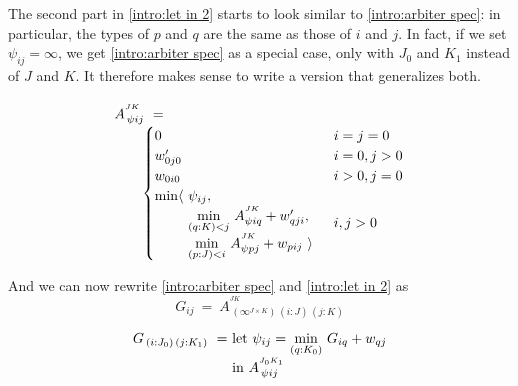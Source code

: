 \medskip
The second part in \eqref{intro:let in 2} starts to look similar to \eqref{intro:arbiter spec}:
in particular, the types of $p$ and $q$ are the same as those of $i$ and $j$.
In fact, if we set $\psi_{ij}=\infty$, we get \eqref{intro:arbiter spec} as a special case,
only with $J_0$ and $K_1$ instead of $J$ and $K$.
It therefore makes sense to write a version that generalizes both.

\begin{equation}\LeftEqNo
\renewcommand\arraystretch{1.5}
\begin{array}{l}
	A^{^{JK}}_{\,\psi ij} ~=~  \\
	\qquad
	\begin{cases}
		0                        & i=j=0 \\
		w'_{0j0}                 & i=0, j>0 \\
		w_{0i0}                  & i>0, j=0 \\
		\begin{array}{@{}l@{~}l}
		  \min\langle & \psi_{ij}, \\
		              & \underset{(q:K)<j}\min ~ A^{^{JK}}_{\psi iq} + w'_{qji}, \\
		              & \underset{(p:J)<i}\min ~ A^{^{JK}}_{\psi pj} + w_{pij}~\rangle
		\end{array}              & i,j>0
	\end{cases}
\end{array}
\label{intro:arbiter phase A}
\end{equation}

\medskip
And we can now rewrite \eqref{intro:arbiter spec} and \eqref{intro:let in 2} as
%
\begin{equation}
	G_{ij} ~=~ A^{^{JK}}_{\,(\infty^{J\times K})\,(i:J)\,(j:K)}
\end{equation}
%
\begin{equation}
\renewcommand\arraystretch{1.3}
\begin{array}{l@{}l}
	G_{\,(i : J_0)\,(j : K_1)} ~=~ 
	& \textrm{let}~\psi_{ij} = \underset{(q:K_0)}\min ~ G_{iq} + w_{qj} \\
	& \textrm{in}~A^{^{J_0K_1}}_{\,\psi ij}
\end{array}	
\label{intro:let in 2 using A}
\end{equation}

\newcommand\otherwise{\textrm{\small otherwise}}

